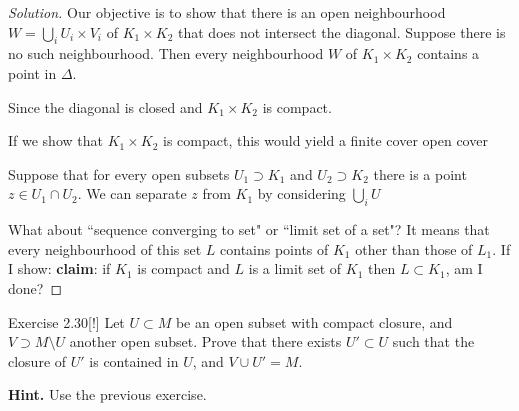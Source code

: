 \begin{proof}[Solution]
Our objective is to show that there is an open neighbourhood \(W= \bigcup_{i} U_i \times V_i\) of \(K_1 \times K_2\) that does not intersect the diagonal. Suppose there is no such neighbourhood. Then every neighbourhood \(W\) of \(K_1\times K_2\) contains a point in \(\Delta\).

Since the diagonal is closed and \(K_1 \times K_2\) is compact.

If we show that \(K_1 \times K_2\) is compact, this would yield a finite cover open cover




	Suppose that for every open subsets \(U_1 \supset K_1\) and \(U_2 \supset K_2\) there is a point \(z \in U_1 \cap U_2\). We can separate \(z\) from \(K_1\) by considering \(\bigcup_{i} U\)

What about ``sequence converging to set" or ``limit set of a set"? It means that every  neighbourhood of this set \(L\) contains points of \(K_1\) other than those of \(L_1\). If I show: \textbf{claim}: if \(K_1\) is compact and \(L\) is a limit set of \(K_1\) then \(L \subset K_1\), am I done?
\end{proof}
\fi

\begin{thing4}{Exercise 2.30}[!]\label{exer:2.30}\leavevmode
Let \(U \subset M\) be an open subset with compact closure, and \(V \supset M\setminus U\) another open subset. Prove that there exists \(U' \subset U\) such that the closure of \(U'\) is contained in \(U\), and \(V \cup  U'=M\).

\textbf{Hint.} Use the previous exercise.
\end{thing4}

